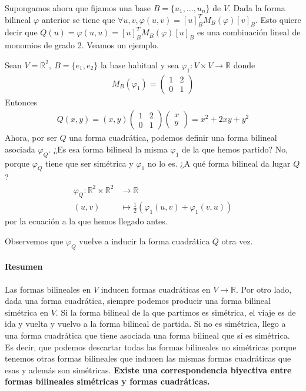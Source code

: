 \documentclass[14pt]{book}
\begin{document}
Supongamos ahora que fijamos una base $B = \{u_1, \dots, u_n\}$ de $V$. Dada la forma bilineal $\varphi$ anterior se tiene que $\forall u,v, \varphi(u,v) = [u]_B^T M_B(\varphi) [v]_B$. Esto quiere decir que $Q(u) = \varphi (u, u) = [u]_B^T M_B(\varphi) [u]_B$ es una combinación lineal de monomios de grado 2. Veamos un ejemplo.

\begin{ej}
	Sean $V = \mathbb{R}^2,\ B = \{e_1, e_2\}$ la base habitual y sea $\varphi_1 : V \times V \to \mathbb{R}$ donde 
	\begin{align*}
		M_B(\varphi_1) = \left(\begin{array}{cc}
		1 & 2 \\ 0 & 1
		\end{array}\right)
	\end{align*}
	Entonces
	\begin{align*}
		Q(x, y) = (x, y) \left(\begin{array}{cc}
			1 & 2 \\ 0 & 1
		\end{array}\right)\left(\begin{array}{c}
		x \\ y
		\end{array}\right) = x^2 + 2xy + y^2
	\end{align*}
	Ahora, por ser $Q$ una forma cuadrática, podemos definir una forma bilineal asociada $\varphi_Q$. ¿Es esa forma bilineal la misma $\varphi_1$ de la que hemos partido? No, porque $\varphi_Q$ tiene que ser simétrica y $\varphi_1$ no lo es. ¿A qué forma bilineal da lugar $Q$?
	\begin{align*}
		\varphi_Q : \mathbb{R}^2 \times \mathbb{R}^2 & \to \mathbb{R} \\
		(u, v) &\mapsto \frac{1}{2} (\varphi_1(u, v) + \varphi_1(v, u))
	\end{align*}
	por la ecuación a la que hemos llegado antes.
	
	Observemos que $\varphi_Q$ vuelve a inducir la forma cuadrática $Q$ otra vez.
\end{ej}

\paragraph{Resumen} Las formas bilineales en $V$ inducen formas cuadráticas en $V \to \mathbb{R}$. Por otro lado, dada una forma cuadrática, siempre podemos producir una forma bilineal simétrica en $V$. Si la forma bilineal de la que partimos es simétrica, el viaje es de ida y vuelta y vuelvo a la forma bilineal de partida. Si no es simétrica, llego a una forma cuadrática que tiene asociada una forma bilineal que sí es simétrica. Es decir, que podemos descartar todas las formas bilineales no simétricas porque tenemos otras formas bilineales que inducen las mismas formas cuadráticas que esas y además son simétricas. \textbf{Existe una correspondencia biyectiva entre formas bilineales simétricas y formas cuadráticas.}
\end{document}
